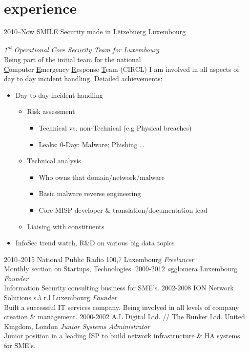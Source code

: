 \documentclass[]{friggeri-cv} %
\begin{document}
\section{experience}
\begin{entrylist}
\entry
{2010--Now}
{SMILE Security made in L\"{e}tzebuerg}
{Luxembourg}
{\emph{1\textsuperscript{st} Operational Core Security Team for Luxembourg} \\
Being part of the initial team for the national \\
\underline{C}omputer \underline{E}mergency \underline{R}esponse \underline{T}eam (CIRCL) I am involved in all aspects of day to day incident handling. Detailed achievements:
\begin{itemize}
    \item Day to day incident handling
    \begin{itemize}
        \item Risk assessment
        \begin{itemize}
        	\item Technical vs. non-Technical (e.g Physical breaches)
            \item Leaks; 0-Day; Malware; Phishing \ldots
        \end{itemize}
        \item Technical analysis
        \begin{itemize}
             \item Who owns that domain/network/malware
             \item Basic malware reverse engineering
             \item Core MISP developer \& translation/documentation lead
        \end{itemize}
        \item Liaising with constituents
    \end{itemize}
    \item InfoSec trend watch, R\&D on various big data topics
\end{itemize}}
\entry
{2010--2015}
{National Public Radio 100,7}
{Luxembourg}
{\emph{Freelancer} \\
Monthly section on Startups, Technologies.}
\entry
{2009-2012}
{\emph{a}gglomera}
{Luxembourg}
{\emph{Founder} \\
Information Security consulting business for SME's.}
\entry
{2002-2008}
{ION Network Solutions s.\`{a} r.l}
{Luxembourg}
{\emph{Founder} \\
Built a successful IT services company. Being involved in all levels of company creation \& management.}
\entry
{2000-2002}
{A.L Digital Ltd. // The Bunker Ltd.}
{United Kingdom, London}
{\emph{Junior Systems Administrator} \\
Junior position in a leading ISP to build network infrastructure \& HA systems for SME's.}
\end{entrylist}
\end{document}
